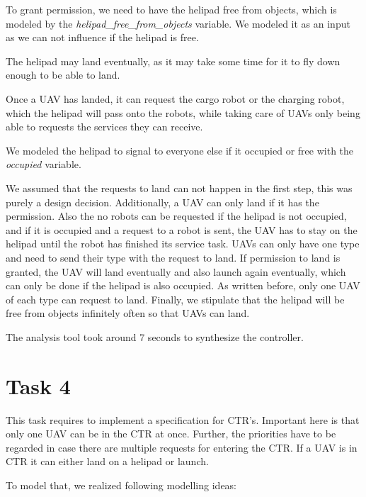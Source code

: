 \documentclass[	runningheads,
				a4paper]{llncs}
\begin{document}
To grant permission, we need to have the helipad free from objects, which is modeled by the \textit{helipad\_free\_from\_objects} variable. We modeled it as an input as we can not influence if the helipad is free.

The helipad may land eventually, as it may take some time for it to fly down enough to be able to land.

Once a UAV has landed, it can request the cargo robot or the charging robot, which the helipad will pass onto the robots, while taking care of UAVs only being able to requests the services they can receive.

We modeled the helipad to signal to everyone else if it occupied or free with the \textit{occupied} variable. 

We assumed that the requests to land can not happen in the first step, this was purely a design decision. 
Additionally, a UAV can only land if it has the permission. 
Also the no robots can be requested if the helipad is not occupied, and if it is occupied and a request to a robot is sent, the UAV has to stay on the helipad until the robot has finished its service task. 
UAVs can only have one type and need to send their type with the request to land.
If permission to land is granted, the UAV will land eventually and also launch again eventually, which can only be done if the helipad is also occupied.
As written before, only one UAV of each type can request to land.
Finally, we stipulate that the helipad will be free from objects infinitely often so that UAVs can land.


The analysis tool took around 7 seconds to synthesize the controller.




\section{Task 4}

This task requires to implement a specification for CTR's. Important here is that only one UAV can be in the CTR at once. Further, the priorities have to be regarded in case there are multiple requests for entering the CTR. If a UAV is in CTR it can either land on a helipad or launch.

To model that, we realized following modelling ideas:
\end{document}
